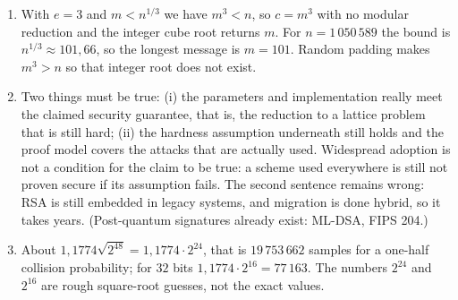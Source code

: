\begin{enumerate}[label=\textbf{31.\arabic*}]
  \item With $e=3$ and $m<n^{1/3}$ we have $m^{3}<n$, so $c=m^{3}$ with no
        modular reduction and the integer cube root returns $m$.
        For $n=1\,050\,589$ the bound is $n^{1/3}\approx101{,}66$, so the longest
        message is $m=101$. Random padding makes $m^{3}>n$ so that integer root
        does not exist.

  \item Two things must be true: (i) the parameters and implementation really
        meet the claimed security guarantee, that is, the reduction to a lattice
        problem that is still hard; (ii) the hardness assumption underneath still
        holds and the proof model covers the attacks that are actually used.
        Widespread adoption is not a condition for the claim to be true: a scheme
        used everywhere is still not proven secure if its assumption fails.
        The second sentence remains wrong: RSA is still embedded in legacy systems,
        and migration is done hybrid, so it takes years. (Post-quantum signatures
        already exist: ML-DSA, FIPS 204.)

  \item About $1{,}1774\sqrt{2^{48}}=1{,}1774\cdot2^{24}$, that is $19\,753\,662$
        samples for a one-half collision probability; for $32$ bits
        $1{,}1774\cdot2^{16}=77\,163$. The numbers $2^{24}$ and $2^{16}$ are rough
        square-root guesses, not the exact values.
\end{enumerate}

